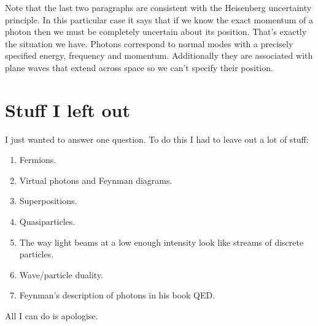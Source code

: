 \documentclass[a4paper]{article}
\begin{document}
Note that the last two paragraphs are consistent with the Heisenberg uncertainty principle.
In this particular case it says that if we know the exact momentum of a photon then we must be completely uncertain about its position.
That's exactly the situation we have.
Photons correspond to normal modes with a precisely specified energy, frequency and momentum.
Additionally they are associated with plane waves that extend across space so we can't specify  their position.

\section{Stuff I left out}
I just wanted to answer one question.
To do this I had to leave out a lot of stuff:
\begin{enumerate}
\item Fermions.
\item Virtual photons and Feynman diagrams.
\item Superpositions.
\item Quasiparticles.
\item The way light beams at a low enough intensity look like streams of discrete particles.
\item Wave/particle duality.
\item Feynman's description of photons in his book QED.
\end{enumerate}
All I can do is apologise.
\end{document}
